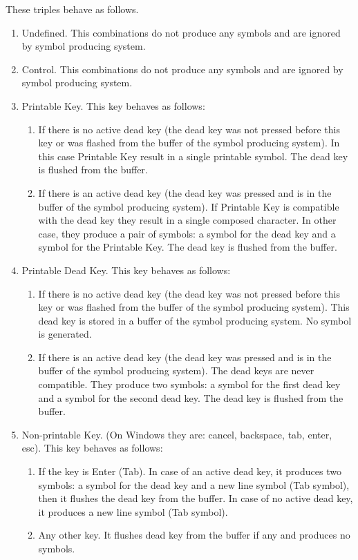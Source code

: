 \documentclass{article}
\begin{document}
These triples behave as follows.
\begin{enumerate}
\item Undefined. This combinations do not produce any symbols and are ignored by symbol producing system.
\item Control. This combinations do not produce any symbols and are ignored by symbol producing system.
\item Printable Key. This key behaves as follows:
\begin{enumerate}
\item If there is no active dead key (the dead key was not pressed before this key or was flashed from the buffer of the symbol producing system). In this case Printable Key result in a single printable symbol. The dead key is flushed from the buffer.
\item If there is an active dead key (the dead key was pressed and is in the buffer of the symbol producing system). If Printable Key is compatible with the dead key they result in a single composed character. In other case, they produce a pair of symbols: a symbol for the dead key and a symbol for the Printable Key. The dead key is flushed from the buffer.
\end{enumerate}
\item Printable Dead Key. This key behaves as follows:
\begin{enumerate}
\item If there is no active dead key (the dead key was not pressed before this key or was flashed from the buffer of the symbol producing system). This dead key is stored in a buffer of the symbol producing system. No symbol is generated.
\item If there is an active dead key (the dead key was pressed and is in the buffer of the symbol producing system). The dead keys are never compatible. They produce two symbols: a symbol for the first dead key and a symbol for the second dead key. The dead key is flushed from the buffer.
\end{enumerate}
\item Non-printable Key. (On Windows they are: cancel, backspace, tab, enter, esc). This key behaves as follows:
\begin{enumerate}
\item If the key is Enter (Tab). In case of an active dead key, it produces two symbols: a symbol for the dead key and a new line symbol (Tab symbol), then it flushes the dead key from the buffer. In case of no active dead key, it produces a new line symbol (Tab symbol).
\item Any other key. It flushes dead key from the buffer if any and produces no symbols.
\end{enumerate}
\end{enumerate}
\end{document}
